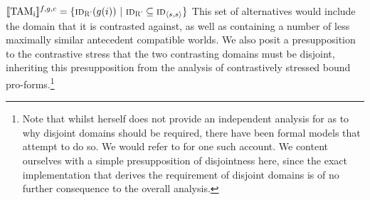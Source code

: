 \a $\intension[f,g,c]{TAM\textsubscript{i}}=\{\predicate{id\textsubscript{R'}}(g(i))~|~\predicate{id\textsubscript{R'}}\subseteq \predicate{id}_{\langle s,s\rangle}\}$
\xe
This set of alternatives would include the domain that it is contrasted against, as well as containing a number of less maximally similar antecedent compatible worlds. We also posit a presupposition to the contrastive stress that the two contrasting domains must be disjoint, inheriting this presupposition from the analysis of contrastively stressed bound pro-forms.\footnote{Note that whilst \textcite{Jacobson2000,Jacobson2004} herself does not provide an independent analysis for as to why disjoint domains should be required, there have been formal models that attempt to do so. We would refer to \textcite[p.~321 ff.]{Mayr2012} for one such account. We content ourselves with a simple presupposition of disjointness here, since the exact implementation that derives the requirement of disjoint domains is of no further consequence to the overall analysis.}

